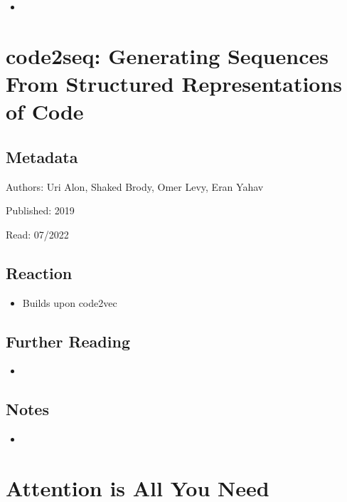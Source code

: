 \documentclass{article}
\begin{document}
\begin{itemize}
	\item
\end{itemize}

\pagebreak


\section*{code2seq: Generating Sequences From Structured Representations of Code}

\subsection*{Metadata}

\noindent Authors: Uri Alon, Shaked Brody, Omer Levy, Eran Yahav

\noindent Published: 2019

\noindent Read: 07/2022

\subsection*{Reaction}
\begin{itemize}
\item Builds upon code2vec
\end{itemize}

\subsection*{Further Reading}
\begin{itemize}
	\item
\end{itemize}

\subsection*{Notes}

\begin{itemize}
	\item
\end{itemize}

\pagebreak


\section*{Attention is All You Need}
\end{document}
